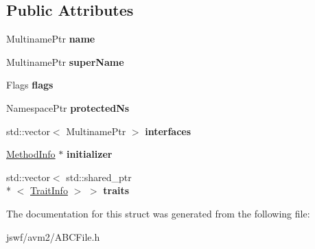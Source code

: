 \subsection*{Public Attributes}
\begin{DoxyCompactItemize}
\item 
\hypertarget{structjswf_1_1avm2_1_1_instance_info_ad13864988ec329dafa299adaf7f92166}{Multiname\+Ptr {\bfseries name}}\label{structjswf_1_1avm2_1_1_instance_info_ad13864988ec329dafa299adaf7f92166}

\item 
\hypertarget{structjswf_1_1avm2_1_1_instance_info_a38f867e63d526149c7d343ca5c61655a}{Multiname\+Ptr {\bfseries super\+Name}}\label{structjswf_1_1avm2_1_1_instance_info_a38f867e63d526149c7d343ca5c61655a}

\item 
\hypertarget{structjswf_1_1avm2_1_1_instance_info_a3a073d319cd66dff46ebb48c9d00d5f1}{Flags {\bfseries flags}}\label{structjswf_1_1avm2_1_1_instance_info_a3a073d319cd66dff46ebb48c9d00d5f1}

\item 
\hypertarget{structjswf_1_1avm2_1_1_instance_info_a9ea1d5f094ff213ff4c5a091e288405f}{Namespace\+Ptr {\bfseries protected\+Ns}}\label{structjswf_1_1avm2_1_1_instance_info_a9ea1d5f094ff213ff4c5a091e288405f}

\item 
\hypertarget{structjswf_1_1avm2_1_1_instance_info_a6189acb4157edacb457337cba4d642ed}{std\+::vector$<$ Multiname\+Ptr $>$ {\bfseries interfaces}}\label{structjswf_1_1avm2_1_1_instance_info_a6189acb4157edacb457337cba4d642ed}

\item 
\hypertarget{structjswf_1_1avm2_1_1_instance_info_a8a30b54bd64c13c057ac9f7cf35ddd0e}{\hyperlink{structjswf_1_1avm2_1_1_method_info}{Method\+Info} $\ast$ {\bfseries initializer}}\label{structjswf_1_1avm2_1_1_instance_info_a8a30b54bd64c13c057ac9f7cf35ddd0e}

\item 
\hypertarget{structjswf_1_1avm2_1_1_instance_info_adbfcf225e4ccdc11f7598457c32b04c1}{std\+::vector$<$ std\+::shared\+\_\+ptr\\*
$<$ \hyperlink{structjswf_1_1avm2_1_1_trait_info}{Trait\+Info} $>$ $>$ {\bfseries traits}}\label{structjswf_1_1avm2_1_1_instance_info_adbfcf225e4ccdc11f7598457c32b04c1}

\end{DoxyCompactItemize}


The documentation for this struct was generated from the following file\+:\begin{DoxyCompactItemize}
\item 
jswf/avm2/A\+B\+C\+File.\+h\end{DoxyCompactItemize}

